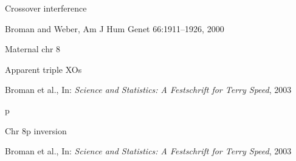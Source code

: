 \documentclass[aspectratio=169,12pt,t]{beamer}
\begin{document}
\begin{frame}[c]{}


\note{
}

\end{frame}






\begin{frame}{Crossover interference}


\vspace{3mm}

\hfill {\scriptsize \lolit Broman and Weber, Am J Hum Genet 66:1911--1926, 2000}

\note{
}

\end{frame}



\begin{frame}[c]{Maternal chr 8}

\note{
}

\end{frame}



\begin{frame}{Apparent triple XOs}


\vspace{2mm}

\hfill {\scriptsize \lolit Broman et al., In: \emph{Science and Statistics: A Festschrift for Terry Speed}, 2003}

\note{
}

\end{frame}
p

\begin{frame}{Chr 8p inversion}


\vspace{2mm}

\hfill {\scriptsize \lolit Broman et al., In: \emph{Science and Statistics: A Festschrift for Terry Speed}, 2003}

\note{
}

\end{frame}
\end{document}
